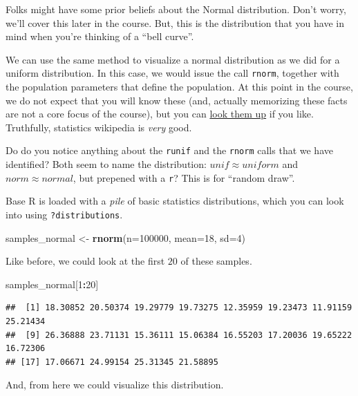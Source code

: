 \documentclass[
]{book}
\newenvironment{Shaded}{\begin{snugshade}}{\end{snugshade}}
\newcommand{\AttributeTok}[1]{\textcolor[rgb]{0.13,0.29,0.53}{#1}}
\newcommand{\DecValTok}[1]{\textcolor[rgb]{0.00,0.00,0.81}{#1}}
\newcommand{\FunctionTok}[1]{\textcolor[rgb]{0.13,0.29,0.53}{\textbf{#1}}}
\newcommand{\NormalTok}[1]{#1}
\newcommand{\OtherTok}[1]{\textcolor[rgb]{0.56,0.35,0.01}{#1}}
\newcommand{\SpecialCharTok}[1]{\textcolor[rgb]{0.81,0.36,0.00}{\textbf{#1}}}
\theoremstyle{definition}
\theoremstyle{definition}
\theoremstyle{definition}
\theoremstyle{definition}
\theoremstyle{remark}
\begin{document}
Folks might have some prior beliefs about the Normal distribution. Don't worry, we'll cover this later in the course. But, this is the distribution that you have in mind when you're thinking of a ``bell curve''.

We can use the same method to visualize a normal distribution as we did for a uniform distribution. In this case, we would issue the call \texttt{rnorm}, together with the population parameters that define the population. At this point in the course, we do not expect that you will know these (and, actually memorizing these facts are not a core focus of the course), but you can \href{https://en.wikipedia.org/wiki/Normal_distribution}{look them up} if you like. Truthfully, statistics wikipedia is \emph{very} good.

Do do you notice anything about the \texttt{runif} and the \texttt{rnorm} calls that we have identified? Both seem to name the distribution: \(unif \approx uniform\) and \(norm \approx normal\), but prepened with a \texttt{r}? This is for ``random draw''.

Base R is loaded with a \emph{pile} of basic statistics distributions, which you can look into using \texttt{?distributions}.

\begin{Shaded}
\begin{Highlighting}[]
\NormalTok{samples\_normal }\OtherTok{\textless{}{-}} \FunctionTok{rnorm}\NormalTok{(}\AttributeTok{n=}\DecValTok{100000}\NormalTok{, }\AttributeTok{mean=}\DecValTok{18}\NormalTok{, }\AttributeTok{sd=}\DecValTok{4}\NormalTok{)}
\end{Highlighting}
\end{Shaded}

Like before, we could look at the first \(20\) of these samples.

\begin{Shaded}
\begin{Highlighting}[]
\NormalTok{samples\_normal[}\DecValTok{1}\SpecialCharTok{:}\DecValTok{20}\NormalTok{]}
\end{Highlighting}
\end{Shaded}

\begin{verbatim}
##  [1] 18.30852 20.50374 19.29779 19.73275 12.35959 19.23473 11.91159 25.21434
##  [9] 26.36888 23.71131 15.36111 15.06384 16.55203 17.20036 19.65222 16.72306
## [17] 17.06671 24.99154 25.31345 21.58895
\end{verbatim}

And, from here we could visualize this distribution.
\end{document}
